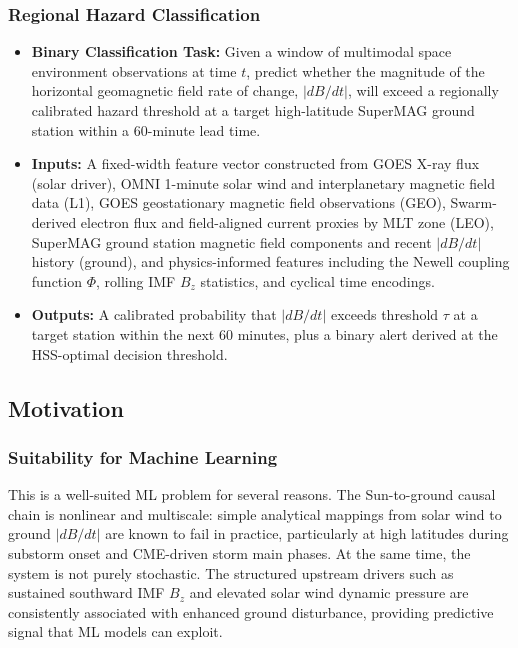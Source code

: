 \documentclass{article}
\begin{document}
\subsubsection*{Regional Hazard Classification}
\begin{itemize}
  \item \textbf{Binary Classification Task:} Given a window of multimodal space environment observations at time $t$, predict whether the magnitude of the horizontal geomagnetic field rate of change, $|dB/dt|$, will exceed a regionally calibrated hazard threshold at a target high-latitude SuperMAG ground station within a 60-minute lead time.
  \item \textbf{Inputs:} A fixed-width feature vector constructed from GOES X-ray flux (solar driver), OMNI 1-minute solar wind and interplanetary magnetic field data (L1), GOES geostationary magnetic field observations (GEO), Swarm-derived electron flux and field-aligned current proxies by MLT zone (LEO), SuperMAG ground station magnetic field components and recent $|dB/dt|$ history (ground), and physics-informed features including the Newell coupling function $\Phi$, rolling IMF $B_z$ statistics, and cyclical time encodings.
  \item \textbf{Outputs:} A calibrated probability that $|dB/dt|$ exceeds threshold $\tau$ at a target station within the next 60 minutes, plus a binary alert derived at the HSS-optimal decision threshold.
\end{itemize}

\subsection*{Motivation}

\subsubsection*{Suitability for Machine Learning}
This is a well-suited ML problem for several reasons. The Sun-to-ground causal chain is nonlinear and multiscale: simple analytical mappings from solar wind to ground $|dB/dt|$ are known to fail in practice, particularly at high latitudes during substorm onset and CME-driven storm main phases. At the same time, the system is not purely stochastic. The structured upstream drivers such as sustained southward IMF $B_z$ and elevated solar wind dynamic pressure are consistently associated with enhanced ground disturbance, providing predictive signal that ML models can exploit.\\
\end{document}
